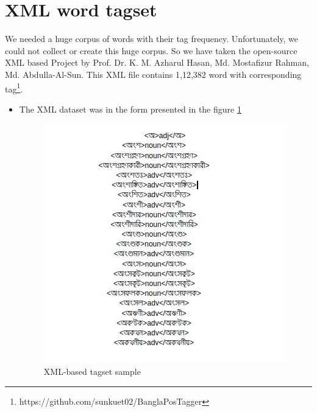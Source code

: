 \documentclass{standalone}
\begin{document}
\section{XML word tagset}
We needed a huge corpus of words with their tag frequency. Unfortunately, we could not collect or create this huge corpus. So we have taken the open-source XML based Project by Prof. Dr. K. M. Azharul Hasan, Md. Mostafizur Rahman, Md. Abdulla-Al-Sun. This XML file contains 1,12,382 word with corresponding tag\footnote{https://github.com/sunkuet02/BanglaPosTagger}.
\begin{itemize}
    \item The XML dataset was in the form presented in the figure \ref{sd1}
    \begin{figure}[h!]
    \centering
    \includegraphics[width=1.0\columnwidth]{img/xml.png}
    \caption{XML-based tagset sample}
    \label{sd1}
    \end{figure}
\end{itemize}
\end{document}
